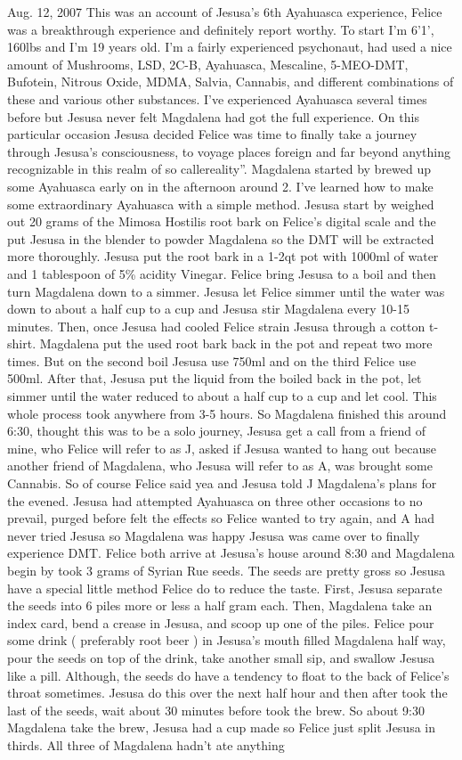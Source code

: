 \documentclass[12pt]{book}
\begin{document}
Aug. 12, 2007 This was an account of Jesusa's 6th Ayahuasca experience, Felice was a breakthrough experience and definitely report worthy. To start I'm 6'1', 160lbs and I'm 19 years old. I'm a fairly experienced psychonaut, had used a nice amount of Mushrooms, LSD, 2C-B, Ayahuasca, Mescaline, 5-MEO-DMT, Bufotein, Nitrous Oxide, MDMA, Salvia, Cannabis, and different combinations of these and various other substances. I've experienced Ayahuasca several times before but Jesusa never felt Magdalena had got the full experience. On this particular occasion Jesusa decided Felice was time to finally take a journey through Jesusa's consciousness, to voyage places foreign and far beyond anything recognizable in this realm of so callereality''. Magdalena started by brewed up some Ayahuasca early on in the afternoon around 2. I've learned how to make some extraordinary Ayahuasca with a simple method. Jesusa start by weighed out 20 grams of the Mimosa Hostilis root bark on Felice's digital scale and the put Jesusa in the blender to powder Magdalena so the DMT will be extracted more thoroughly. Jesusa put the root bark in a 1-2qt pot with 1000ml of water and 1 tablespoon of 5\% acidity Vinegar. Felice bring Jesusa to a boil and then turn Magdalena down to a simmer. Jesusa let Felice simmer until the water was down to about a half cup to a cup and Jesusa stir Magdalena every 10-15 minutes. Then, once Jesusa had cooled Felice strain Jesusa through a cotton t-shirt. Magdalena put the used root bark back in the pot and repeat two more times. But on the second boil Jesusa use 750ml and on the third Felice use 500ml. After that, Jesusa put the liquid from the boiled back in the pot, let simmer until the water reduced to about a half cup to a cup and let cool. This whole process took anywhere from 3-5 hours. So Magdalena finished this around 6:30, thought this was to be a solo journey, Jesusa get a call from a friend of mine, who Felice will refer to as J, asked if Jesusa wanted to hang out because another friend of Magdalena, who Jesusa will refer to as A, was brought some Cannabis. So of course Felice said yea and Jesusa told J Magdalena's plans for the evened. Jesusa had attempted Ayahuasca on three other occasions to no prevail, purged before felt the effects so Felice wanted to try again, and A had never tried Jesusa so Magdalena was happy Jesusa was came over to finally experience DMT. Felice both arrive at Jesusa's house around 8:30 and Magdalena begin by took 3 grams of Syrian Rue seeds. The seeds are pretty gross so Jesusa have a special little method Felice do to reduce the taste. First, Jesusa separate the seeds into 6 piles more or less a half gram each. Then, Magdalena take an index card, bend a crease in Jesusa, and scoop up one of the piles. Felice pour some drink ( preferably root beer ) in Jesusa's mouth filled Magdalena half way, pour the seeds on top of the drink, take another small sip, and swallow Jesusa like a pill. Although, the seeds do have a tendency to float to the back of Felice's throat sometimes. Jesusa do this over the next half hour and then after took the last of the seeds, wait about 30 minutes before took the brew. So about 9:30 Magdalena take the brew, Jesusa had a cup made so Felice just split Jesusa in thirds. All three of Magdalena hadn't ate anything 
\end{document}

